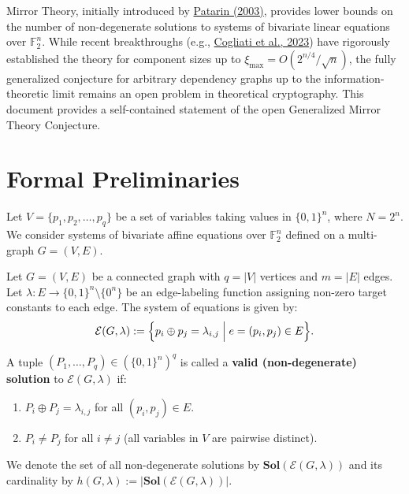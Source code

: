 \documentclass{aicr-conjecture}
\begin{document}

\vspace{0.4em}

Mirror Theory, initially introduced by \href{https://iacr.org/archive/crypto2003/27290510/27290510.pdf}{Patarin (2003)}, provides lower bounds on the number of non-degenerate solutions to systems of bivariate linear equations over $\mathbb{F}_2^n$. While recent breakthroughs (e.g., \href{https://eprint.iacr.org/2022/686}{Cogliati et al., 2023}) have rigorously established the theory for component sizes up to $\xi_{\max} = O(2^{n/4}/\sqrt{n})$, the fully generalized conjecture for arbitrary dependency graphs up to the information-theoretic limit remains an open problem in theoretical cryptography. This document provides a self-contained statement of the open Generalized Mirror Theory Conjecture.

\section{Formal Preliminaries}

Let $V = \{p_1, p_2, \dots, p_q\}$ be a set of variables taking values in $\{0,1\}^n$, where $N = 2^n$. We consider systems of bivariate affine equations over $\mathbb{F}_2^n$ defined on a multi-graph $G = (V, E)$.

\begin{definition}
Let $G = (V, E)$ be a connected graph with $q = |V|$ vertices and $m = |E|$ edges. Let $\lambda : E \to \{0,1\}^n \setminus \{0^n\}$ be an edge-labeling function assigning non-zero target constants to each edge. The system of equations is given by:
\begin{equation}
\mathcal{E}(G, \lambda) := \Bigl\{ p_i \oplus p_j = \lambda_{i,j} \;\Big|\; e = (p_i, p_j) \in E \Bigr\}.
\end{equation}
\end{definition}

\begin{definition}
A tuple $(P_1, \dots, P_q) \in (\{0,1\}^n)^q$ is called a \textbf{valid (non-degenerate) solution} to $\mathcal{E}(G, \lambda)$ if:
\begin{enumerate}[label=\roman*.]
    \item $P_i \oplus P_j = \lambda_{i,j}$ for all $(p_i, p_j) \in E$.
    \item $P_i \neq P_j$ for all $i \neq j$ (all variables in $V$ are pairwise distinct).
\end{enumerate}
We denote the set of all non-degenerate solutions by $\mathbf{Sol}(\mathcal{E}(G, \lambda))$ and its cardinality by $h(G, \lambda) := |\mathbf{Sol}(\mathcal{E}(G, \lambda))|$.
\end{definition}
\end{document}
